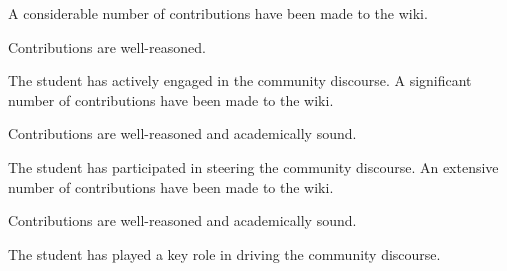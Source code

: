 \documentclass{../../fal_assignment}
\begin{document}
\begin{markingrubric}
        \grade 		A considerable number of contributions have been made to the wiki.
        \par		Contributions are well-reasoned.
        \par		The student has actively engaged in the community discourse.
        \grade 		A significant number of contributions have been made to the wiki.
        \par		Contributions are well-reasoned and academically sound.
        \par		The student has participated in steering the community discourse.
        \grade 		An extensive number of contributions have been made to the wiki.
        \par		Contributions are well-reasoned and academically sound.
        \par		The student has played a key role in driving the community discourse.
\end{markingrubric}
\end{document}
